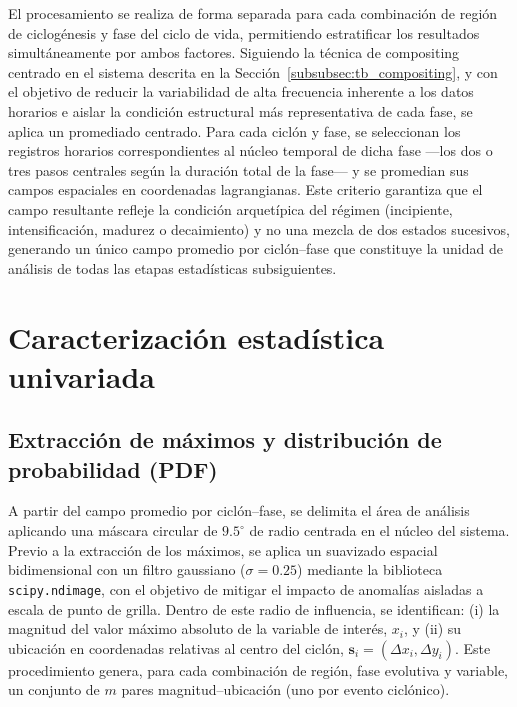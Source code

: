 El procesamiento se realiza de forma separada para cada combinación de región de ciclogénesis y fase del ciclo de vida, permitiendo estratificar los resultados simultáneamente por ambos factores.
Siguiendo la técnica de compositing centrado en el sistema descrita en la Sección~\ref{subsubsec:tb_compositing}, y con el objetivo de reducir la variabilidad de alta frecuencia inherente a los datos horarios e aislar la condición estructural más representativa de cada fase, se aplica un promediado centrado. Para cada ciclón y fase, se seleccionan los registros horarios correspondientes al núcleo temporal de dicha fase —los dos o tres pasos centrales según la duración total de la fase— y se promedian sus campos espaciales en coordenadas lagrangianas.
Este criterio garantiza que el campo resultante refleje la condición arquetípica del régimen (incipiente, intensificación, madurez o decaimiento) y no una mezcla de dos estados sucesivos, generando un único campo promedio por ciclón--fase que constituye la unidad de análisis de todas las etapas estadísticas subsiguientes.


\section{Caracterización estadística univariada}\label{sec:tecnicas_estadisticas}

\subsection{Extracción de máximos y distribución de probabilidad (PDF)}\label{subsec:extraccion_pdf}

A partir del campo promedio por ciclón--fase, se delimita el área de análisis aplicando una máscara circular de $9.5^{\circ}$ de radio centrada en el núcleo del sistema. Previo a la extracción de los máximos, se aplica un suavizado espacial bidimensional con un filtro gaussiano ($\sigma = 0.25$) mediante la biblioteca \texttt{scipy.ndimage}, con el objetivo de mitigar el impacto de anomalías aisladas a escala de punto de grilla. Dentro de este radio de influencia, se identifican: (i) la magnitud del valor máximo absoluto de la variable de interés, $x_i$, y (ii) su ubicación en coordenadas relativas al centro del ciclón, $\mathbf{s}_i = (\Delta x_i, \Delta y_i)$. Este procedimiento genera, para cada combinación de región, fase evolutiva y variable, un conjunto de $m$ pares magnitud--ubicación (uno por evento ciclónico).

